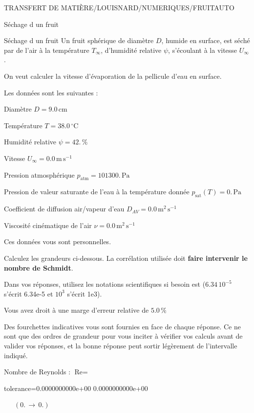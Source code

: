 \documentclass[12pt]{article}
\begin{document}
\begin{quiz}{TRANSFERT DE MATIÈRE/LOUISNARD/NUMERIQUES/FRUITAUTO}
\begin{cloze}{Séchage d un fruit}
\end{cloze} 


 \begin{cloze}{Séchage d un fruit} 
Un fruit sphérique de diamètre $D$, humide en surface, est séché par de l'air à la température $T_\infty$, d'humidité relative $\psi$, s'écoulant à la vitesse $U_\infty$.

On veut calculer la vitesse d'évaporation de la pellicule d'eau en surface.

 

Les données sont les suivantes :

 

Diamètre $D = 9.0\,  \mathrm{cm} $

Température $T = 38.0\,  \mathrm{^\circ\mathrm{C}} $

Humidité relative $\psi = 42.\, \% $

Vitesse $U_\infty = 0.0\,  \mathrm{m}\,  \mathrm{s}^{-1} $

Pression atmosphérique $p_{\text{atm}} = 101300.\,  \mathrm{Pa} $

Pression de valeur saturante de l’eau à la température donnée $p_{\text{sat}}(T) = 0.\,  \mathrm{Pa} $

Coefficient de diffusion air/vapeur d’eau $D_{AV} = 0.0\,  \mathrm{m}^{2}\,  \mathrm{s}^{-1} $

Viscosité cinématique de l’air $\nu = 0.0\,  \mathrm{m}^{2}\,  \mathrm{s}^{-1} $

Ces données vous sont personnelles.

 

Calculez les grandeurs ci-dessous. La corrélation utilisée doit \textbf{faire intervenir le nombre de Schmidt}.

Dans vos réponses, utilisez les notations scientifiques si besoin est ($6.34\, 10^{-5}$ s'écrit 6.34e-5 et $10^{3}$ s'écrit 1e3).

Vous avez droit à une marge d'erreur relative de $5.0\, \% $

Des fourchettes indicatives vous sont fournies en face de chaque réponse. Ce ne sont que des ordres de grandeur pour vous inciter à vérifier vos calculs avant de valider vos réponses, et la bonne réponse peut sortir légèrement de l'intervalle indiqué.

 

Nombre de Reynolds : $\text{Re} =  $
\begin{numerical}[points=1] 
\item[tolerance={0.0000000000e+00}] 0.0000000000e+00 
\end{numerical} 
 $\,$ 
 $ \quad (0. \, \rightarrow \, 0.) $ 


\end{cloze}
\end{quiz}
\end{document}
